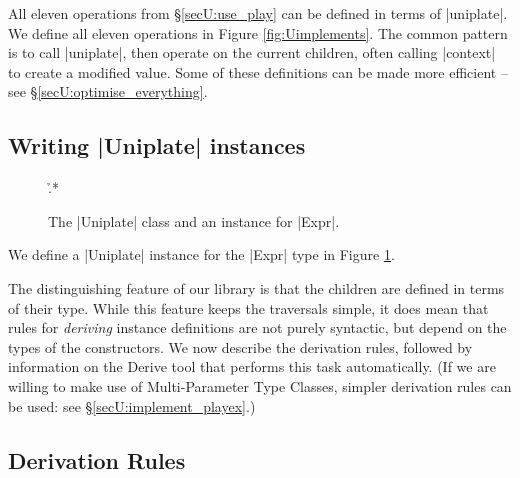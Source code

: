 All eleven operations from \S\ref{secU:use_play} can be defined in terms of |uniplate|. We define all eleven operations in Figure \ref{fig:Uimplements}. The common pattern is to call |uniplate|, then operate on the current children, often calling |context| to create a modified value. Some of these definitions can be made more efficient -- see \S\ref{secU:optimise_everything}.

\subsection{Writing |Uniplate| instances}
\label{secU:play_instances}

\begin{figure}
\h{.*}
\caption{The |Uniplate| class and an instance for |Expr|.}
\label{figU:play_expr}
\end{figure}

We define a |Uniplate| instance for the |Expr| type in Figure \ref{figU:play_expr}.

The distinguishing feature of our library is that the children are defined in terms of their type. While this feature keeps the traversals simple, it does mean that rules for \textit{deriving} instance definitions are not purely syntactic, but depend on the types of the constructors. We now describe the derivation rules, followed by information on the Derive tool that performs this task automatically. (If we are willing to make use of Multi-Parameter Type Classes, simpler derivation rules can be used: see \S\ref{secU:implement_playex}.)


\subsection{Derivation Rules}

